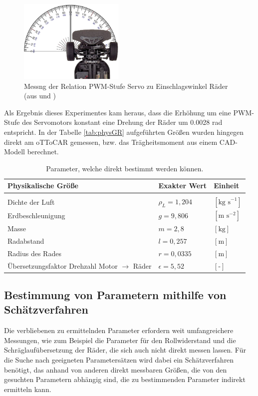 \begin{figure}[ht]
	\centering
	\includegraphics[width=5cm]{Bilder/u1Messung.png}
	\caption[Messng der Relation PWM-Stufe Servo zu Einschlagswinkel Räder]
		{Messng der Relation PWM-Stufe Servo zu Einschlagswinkel Räder (aus \cite{TT01} und \cite{Wim})}
	\label{pict:u1Mess}
\end{figure}

Als Ergebnis dieses Experimentes kam heraus, dass die Erhöhung um eine PWM-Stufe des Servomotors konstant eine Drehung der Räder um 0.0028 rad entspricht. In der Tabelle \ref{tab:physGR} aufgeführten Größen wurden hingegen direkt am oTToCAR gemessen, bzw. das Trägheitsmoment aus einem CAD-Modell \cite{TimMar} berechnet. 

\begin{table}[h!]
\centering
\begin{tabularx}{\columnwidth}{m{6cm}|m{4cm}|X}
  \textbf{Physikalische Größe} & \textbf{Exakter Wert}& \textbf{Einheit}\\\hline\hline 
	\rule{0pt}{1mm} & &\\
	Dichte der Luft & $\rho_{L}=1,204$ & $[\text{kg s}^{-1} ]$\\
	Erdbeschleunigung& $g=9,806$ & $[\text{m s}^{-2}]$\\
	Masse& $m=2,8$ & $[\text{kg}]$\\
  	Radabstand& $l=0,257$ & $[\text{m}]$\\
	Radius des Rades & $r=0,0335$ & $[\text{m}]$\\
	Übersetzungsfaktor Drehzahl Motor $\rightarrow$ Räder  & $\epsilon=5,52$ & $[\text{-}]$
\end{tabularx}
\caption{Parameter, welche direkt bestimmt werden können. \label{tab:Pardir}}
\end{table} 

\subsection{Bestimmung von Parametern mithilfe von Schätzverfahren}
Die verbliebenen zu ermittelnden Parameter erfordern weit umfangreichere Messungen, wie zum Beispiel die Parameter für den Rollwiderstand und die Schräglaufübersetzung der Räder, die sich auch nicht direkt messen lassen. Für die Suche nach geeigneten Parametersätzen wird dabei ein Schätzverfahren benötigt, das anhand von anderen direkt messbaren Größen, die von den gesuchten Parametern abhängig sind, die zu bestimmenden Parameter indirekt ermitteln kann. 

